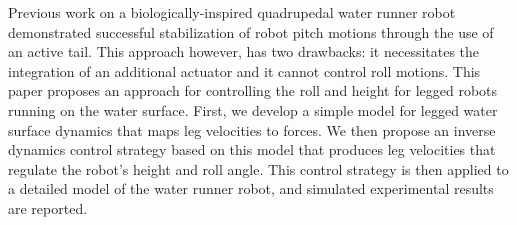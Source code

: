 Previous work on a biologically-inspired quadrupedal water runner robot demonstrated successful stabilization of robot pitch motions through the use of an active tail. 
This approach however, has two drawbacks: it necessitates the integration of an additional actuator and it cannot control roll motions. This paper proposes an approach for controlling the roll and height for legged robots running on the water surface. 
First, we develop a simple model for legged water surface dynamics that maps leg velocities to forces. 
We then propose an inverse dynamics control strategy based on this model that produces leg velocities that regulate the robot's height and roll angle. 
This control strategy is then applied to a detailed model of the water runner robot, and simulated experimental results are reported.
